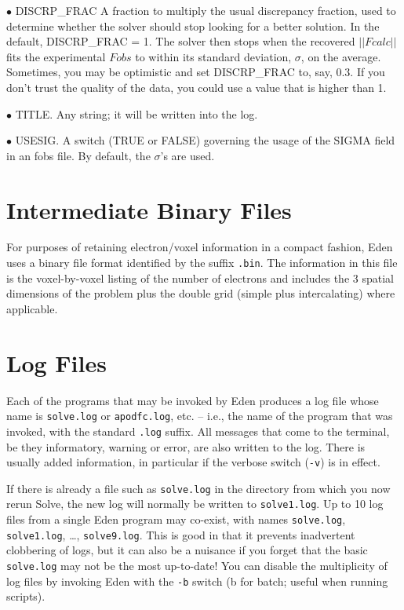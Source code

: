 \documentclass{report}
\begin{document}
$\bullet$ DISCRP\_FRAC
A fraction to multiply the usual discrepancy fraction, used to determine
whether the solver should stop looking for a better solution.
In the default, DISCRP\_FRAC = 1.  The solver then stops when the recovered
$||Fcalc||$ fits the experimental $Fobs$ to within its standard deviation,
$\sigma$, on the average.  Sometimes, you may be optimistic and set
DISCRP\_FRAC to, say, 0.3.  If you don't trust the quality of the data,
you could use a value that is higher than 1.

$\bullet$ TITLE.
  Any string; it will be written into the log.  

$\bullet$ USESIG.
  A switch (TRUE or FALSE) governing the usage of the SIGMA
field in an fobs file.  By default, the $\sigma$'s are used.


\section {Intermediate Binary Files}
\label{files-intermediate}

For purposes of retaining electron/voxel information in a compact fashion, 
Eden uses a binary file format identified by the suffix {\tt .bin}.  
The information in this file is the voxel-by-voxel listing of
the number of electrons and includes the 3 spatial dimensions of the
problem plus the double grid (simple plus intercalating) where applicable.

 
\section {Log Files} 
\label{files-log}

Each of the programs that may be invoked by Eden produces a log file whose
name is {\tt solve.log} or {\tt apodfc.log}, etc. -- i.e., the name of the
program that was invoked, with the standard {\tt .log} suffix.  All messages
that come to the terminal, be they informatory, warning or error, are also
written to the log.  There is usually added information, in particular if
the verbose switch ({\tt -v}) is in effect.  

If there is already a file such
as {\tt solve.log} in the directory from which you now rerun Solve, the new
log will normally be written to {\tt solve1.log}.  Up to 10 log files from a
single Eden program may co-exist, with names 
{\tt solve.log}, {\tt solve1.log}, \dots, {\tt solve9.log}.  
This is good in that it prevents inadvertent clobbering of logs, but it can
also be a nuisance if you forget that the basic {\tt solve.log}
may not be the most up-to-date!  You can disable the multiplicity of
log files by invoking Eden with the {\tt -b} switch (b for batch; useful when 
running scripts).
\end{document}
